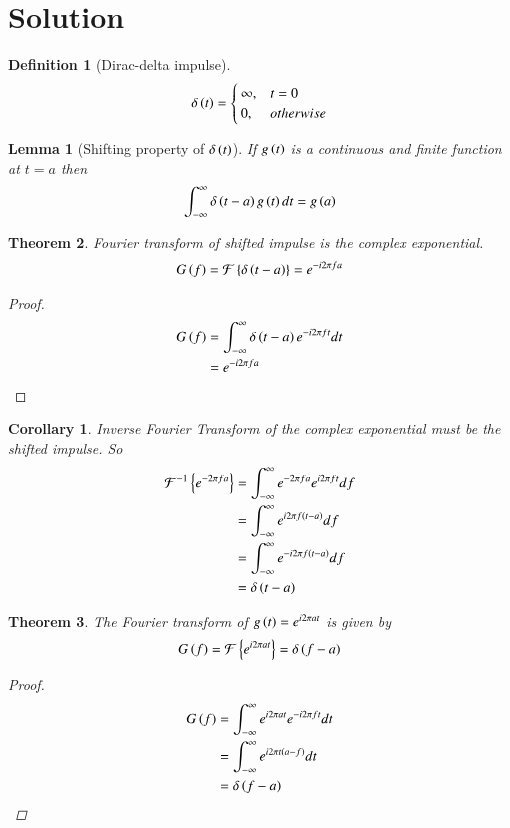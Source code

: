 \documentclass[journal,12pt,twocolumn]{IEEEtran}
\newtheorem{theorem}{Theorem}[section]
\newtheorem{corollary}{Corollary}[theorem]
\newtheorem{lemma}[theorem]{Lemma}
\newtheorem{definition}{Definition}[section]
\begin{document}
\section{Solution}
\begin{definition}[Dirac-delta impulse]
\begin{align}
 \delta\left(t\right)=
 \begin{cases}
 \infty , & t=0\\
 0, & otherwise
 \end{cases}
\end{align}
\end{definition}
\begin{lemma}[Shifting property of $\delta\left(t\right)$]
 If $g\left(t\right)$ is a continuous and finite function at $t=a$ then
 \begin{align}
     \int_{-\infty}^{\infty}\delta\left(t-a\right)g\left(t\right)dt=g\left(a\right)
 \end{align}
\end{lemma}
\begin{theorem}
Fourier transform of shifted impulse is the complex exponential.
\begin{align}
    G\left(f\right)=\mathcal{F}\left\{\delta\left(t-a\right)\right\}=e^{-i2\pi fa}
\end{align}
\end{theorem}
\begin{proof}
 \begin{align}
     G\left(f\right)&=\int_{-\infty}^{\infty}\delta\left(t-a\right)e^{-i2\pi ft}dt\\
     &=e^{-i2\pi fa}
 \end{align}
\end{proof}
\begin{corollary}
Inverse Fourier Transform of the complex exponential must be the shifted impulse. So
\begin{align}
    \mathcal{F}^{-1}\left\{e^{-2\pi fa}\right\}&=\int_{-\infty}^{\infty}e^{-2\pi fa}e^{i2\pi ft}df\\
    &=\int_{-\infty}^{\infty}e^{i2\pi f\left(t-a\right)}df\\
    &=\int_{-\infty}^{\infty}e^{-i2\pi f\left(t-a\right)}df\\
    &=\delta\left(t-a\right)
\end{align}
\end{corollary}
\begin{theorem}
The Fourier transform of $g\left(t\right)=e^{i2\pi at}$ is given by 
\begin{align}
    G\left(f\right)=\mathcal{F}\left\{e^{i2\pi at}\right\}=\delta\left(f-a\right)
\end{align}
\begin{proof}
 \begin{align}
     G\left(f\right)&=\int_{-\infty}^{\infty}e^{i2\pi at}e^{-i2\pi ft}dt\\
     &=\int_{-\infty}^{\infty}e^{i2\pi t\left(a-f\right)}dt\\
     &=\delta\left(f-a\right)
 \end{align}
\end{proof}
\end{theorem}
\end{document}
